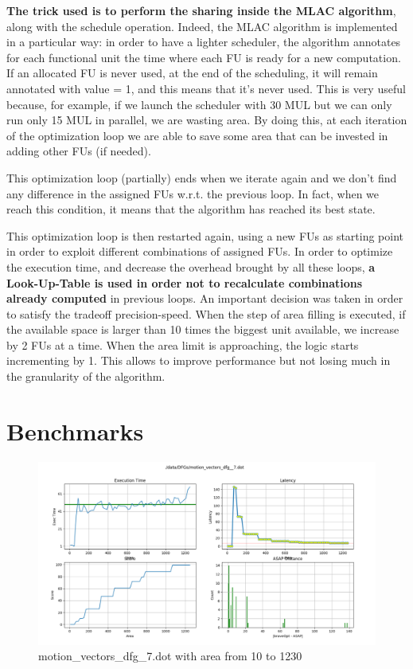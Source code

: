 \documentclass{article}
\begin{document}
	\textbf{The trick used is to perform the sharing inside the MLAC algorithm}, along with the schedule operation. Indeed, the MLAC algorithm is implemented in a particular way: in order to have a lighter scheduler, the algorithm annotates for each functional unit the time where each FU is ready for a new computation. If an allocated FU is never used, at the end of the scheduling, it will remain annotated with value = 1, and this means that it's never used. This is very useful because, for example, if we launch the scheduler with 30 MUL but we can only run only 15 MUL in parallel, we are wasting area. By doing this, at each iteration of the optimization loop we are able to save some area that can be invested in adding other FUs (if needed).
	
	This optimization loop (partially) ends when we iterate again and we don't find any difference in the assigned FUs w.r.t. the previous loop. In fact, when we reach this condition, it means that the algorithm has reached its best state. 
	
	This optimization loop is then restarted again, using a new FUs as starting point in order to exploit different combinations of assigned FUs. In order to optimize the execution time, and decrease the overhead brought by all these loops, \textbf{a Look-Up-Table is used in order not to recalculate combinations already computed} in previous loops. An important decision was taken in order to satisfy the tradeoff precision-speed. When the step of area filling is executed, if the available space is larger than 10 times the biggest unit available, we increase by 2 FUs at a time. When the area limit is approaching, the logic starts incrementing by 1. This allows to improve performance but not losing much in the granularity of the algorithm. 
	
	
	\section{Benchmarks}
	
	\begin{figure}[ht]
		\centering
		\includegraphics[width=1\textwidth]{Immagini/benchmark1.png}
		\caption{motion\_vectors\_dfg\_7.dot with area from 10 to 1230}
		\label{benchmark1}
	\end{figure}
	
	
\end{document}
